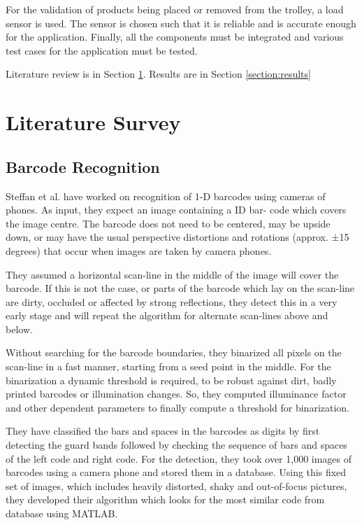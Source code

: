 \documentclass[times, 1pt, a4paper]{article}
\begin{document}
For the validation of products being placed or removed from the trolley, a load sensor is used. The sensor is chosen such that it is reliable and is accurate enough for the application. Finally, all the components must be integrated and various test cases for the application must be tested.


Literature review is in Section \ref{section:literature_survey}. Results are in Section \ref{section:results}

\section{Literature Survey} \label{section:literature_survey}

\subsection{Barcode Recognition} \label{subsection:barcode_recognition}

Steffan et al. \cite{zhang2012research} have worked on recognition of 1-D barcodes using cameras of phones. As input, they expect an image containing a ID bar- code which covers the image centre. The barcode does not need to be centered, may be upside down, or may have the usual perspective distortions and rotations (approx. ±15 degrees) that occur when images are taken by camera phones. 

They assumed a horizontal scan-line in the middle of the image will cover the barcode. If this is not the case, or parts of the barcode which lay on the scan-line are dirty, occluded or affected by strong reflections, they detect this in a very early stage and will repeat the algorithm for alternate scan-lines above and below. 

Without searching for the barcode boundaries, they binarized all pixels on the scan-line in a fast manner, starting from a seed point in the middle. For the binarization a dynamic threshold is required, to be robust against dirt, badly printed barcodes or illumination changes. So, they computed illuminance factor and other dependent parameters to finally compute a threshold for binarization.

They have classified the bars and spaces in the barcodes as digits by first detecting the guard bands followed by checking the sequence of bars and spaces of the left code and right code. For the detection, they took over 1,000 images of barcodes using a camera phone and stored them in a database. Using this fixed set of images, which includes heavily distorted, shaky and out-of-focus pictures, they developed their algorithm which looks for the most similar code from database using MATLAB. 
\end{document}
